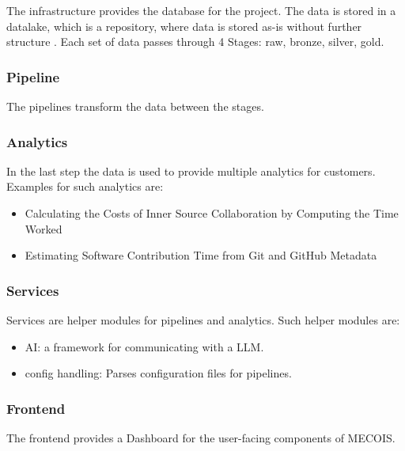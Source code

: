 The infrastructure provides the database for the project. The data is stored in a datalake, which is a repository, where data is stored as-is without further structure \autocite{datalake_aws}. Each set of data passes through 4 Stages: raw, bronze, silver, gold.

\subsubsection{Pipeline}
\label{subsubsec:pipeline}

The pipelines transform the data between the stages.


\subsubsection{Analytics}
\label{subsubsec:analytics}

In the last step the data is used to provide multiple analytics for customers. Examples for such analytics are:

\begin{itemize}
	\item Calculating the Costs of Inner Source Collaboration by Computing the Time Worked \autocite{analytic_cost}
	\item Estimating Software Contribution Time	from Git and GitHub Metadata \autocite{analytic_contribution}
\end{itemize}

\subsubsection{Services}
\label{subsubsec:services}

Services are helper modules for pipelines and analytics. Such helper modules are:

\begin{itemize}
	\item AI: a framework for communicating with a \ac{LLM}.
	\item config handling: Parses configuration files for pipelines.
\end{itemize}

\subsubsection{Frontend}
\label{subsubsec:frontend}

The frontend provides a Dashboard for the user-facing components of MECOIS.

